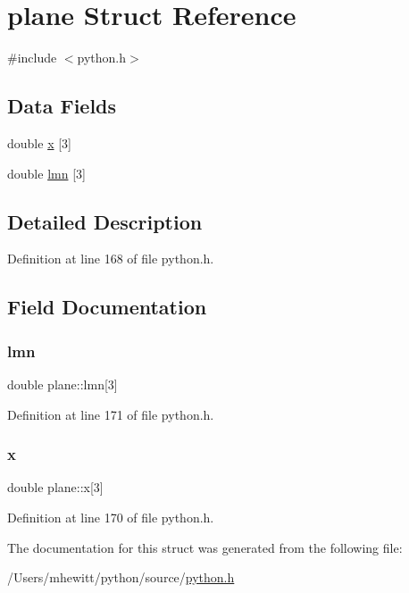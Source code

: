 \hypertarget{structplane}{}\section{plane Struct Reference}
\label{structplane}


{\ttfamily \#include $<$python.\+h$>$}

\subsection*{Data Fields}
\begin{DoxyCompactItemize}
\item 
double \hyperlink{structplane_a3e0a915298ae7b9f7dbde607ebf5e5fa}{x} \mbox{[}3\mbox{]}
\item 
double \hyperlink{structplane_aecafa59e4a24ae66f9dd66e6ce87be4b}{lmn} \mbox{[}3\mbox{]}
\end{DoxyCompactItemize}


\subsection{Detailed Description}


Definition at line 168 of file python.\+h.



\subsection{Field Documentation}
\mbox{\label{structplane_aecafa59e4a24ae66f9dd66e6ce87be4b}} 
\subsubsection{\texorpdfstring{lmn}{lmn}}
{\footnotesize\ttfamily double plane\+::lmn\mbox{[}3\mbox{]}}



Definition at line 171 of file python.\+h.

\mbox{\label{structplane_a3e0a915298ae7b9f7dbde607ebf5e5fa}} 
\subsubsection{\texorpdfstring{x}{x}}
{\footnotesize\ttfamily double plane\+::x\mbox{[}3\mbox{]}}



Definition at line 170 of file python.\+h.



The documentation for this struct was generated from the following file\+:\begin{DoxyCompactItemize}
\item 
/\+Users/mhewitt/python/source/\hyperlink{python_8h}{python.\+h}\end{DoxyCompactItemize}
